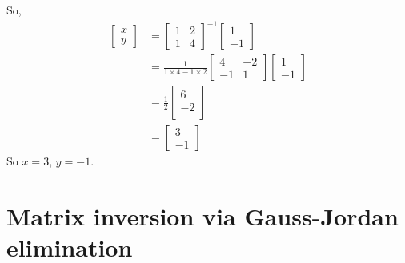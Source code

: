 \documentclass[11pt]{article}
\begin{document}
So,
\begin{align*}
\begin{bmatrix}
x\\
y
\end{bmatrix}
&=
\begin{bmatrix}
1 & 2 \\
1 & 4
\end{bmatrix}^{-1}
\begin{bmatrix}
1\\
-1
\end{bmatrix} \\
&= \frac{1}{1\times 4 - 1\times 2} \begin{bmatrix}
4 & -2 \\
-1 & 1
\end{bmatrix}
\begin{bmatrix}
1\\
-1
\end{bmatrix} \\
&= \frac{1}{2}
\begin{bmatrix}
6 \\
-2 \\
\end{bmatrix} \\
&= \begin{bmatrix}
3\\
-1
\end{bmatrix}
\end{align*}
So $x=3$, $y=-1$.

\section{Matrix inversion via Gauss-Jordan elimination}
\end{document}
